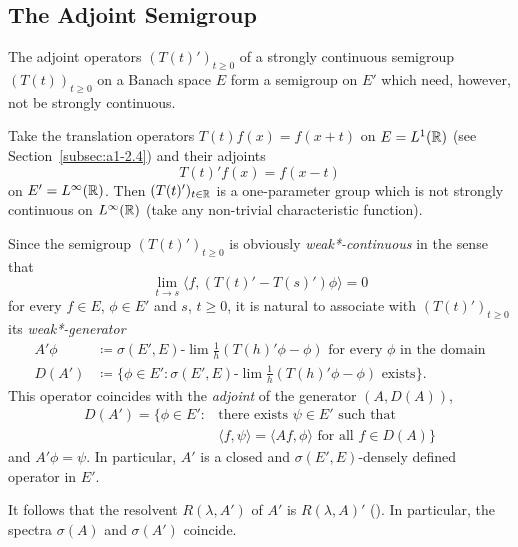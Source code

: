 \subsection{The Adjoint Semigroup}\label{subsec:a1-3.5}%
The adjoint operators $(T(t)')_{t \geq 0}$ of a strongly continuous semigroup $(T(t))_{t \geq 0}$ on a Banach space $E$ form a semigroup on $E'$ which need, however, not be strongly continuous.
\begin{example*}\label{ex:a1-3.2}
Take the translation operators $T(t)f(x) = f(x+t)$ on $E = L^{1}(\mathbb{R})$ (see Section~\ref{subsec:a1-2.4}) and their adjoints
\[
    T(t)'f(x) = f(x-t)
\]
on $E' = L^{\infty}(\mathbb{R})$.
Then $(T(t)')_{t \in \mathbb{R}}$ is a one-parameter group which is not strongly continuous on $L^{\infty}(\mathbb{R})$ (take any non-trivial characteristic function).
\end{example*}
Since the semigroup $(T(t)')_{t \geq 0}$ is 
obviously \emph{weak*-continuous} in the sense that 
\[
\lim_{t \to s} \langle f,(T(t)'-T(s)')\phi \rangle = 0
\]
for every $f \in E$, $\phi \in E'$ and $s$, $t \geq 0$, it is natural to associate with $(T(t)')_{t \geq 0}$ its  \emph{weak*-generator}
\begin{align*}
    A'\phi &\coloneq \sigma(E',E)\text{-}\lim\frac{1}{h}(T(h)'\phi-\phi) \text{ for every } \phi \text{ in the domain} \\
    D(A') &\coloneq \{\phi \in E' \colon \sigma(E',E)\text{-}\lim\frac{1}{h}(T(h)'\phi-\phi) \text{ exists}\}.
\end{align*}
This operator coincides with the \emph{adjoint} of the generator $(A,D(A))$, \ie
\begin{align*}
    D(A') = \{\phi \in E' \colon {} & \text{there exists } \psi \in E' \text{ such that } \\
    & \langle f,\psi \rangle = \langle Af,\phi \rangle \text{ for all } f \in D(A)\}
\end{align*}
and $A'\phi = \psi$.
In particular, $A'$ is a closed and $\sigma(E',E)$-densely defined operator in $E'$.

It follows that the resolvent $R(\lambda,A')$ of\/ $A'$ is $R(\lambda,A)'$ 
(\textcite[Theorem~III.5.30]{kato:1976}).
In particular, the spectra $\sigma(A)$ and $\sigma(A')$ coincide.

